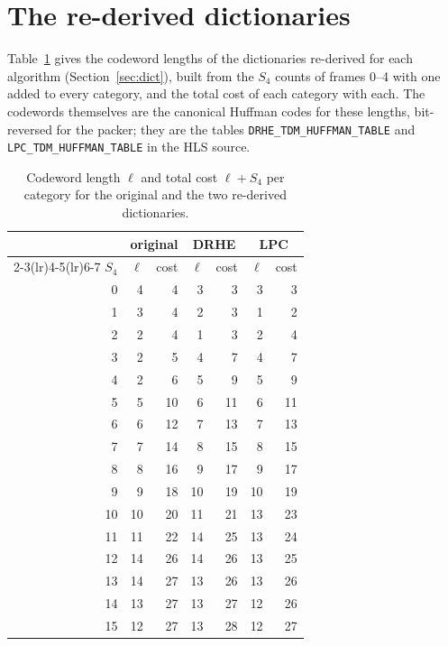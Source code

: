 \section*{The re-derived dictionaries}

Table~\ref{tab:rederived} gives the codeword lengths of the dictionaries
re-derived for each algorithm (Section~\ref{sec:dict}), built from the $S_4$
counts of frames 0--4 with one added to every category, and the total cost of
each category with each. The codewords themselves are the canonical Huffman
codes for these lengths, bit-reversed for the packer; they are the tables
\texttt{DRHE\_TDM\_HUFFMAN\_TABLE} and \texttt{LPC\_TDM\_HUFFMAN\_TABLE} in the
HLS source.

\begin{table}[h]
\centering
\caption[The re-derived dictionaries]{Codeword length $\ell$ and total cost
$\ell + S_4$ per category for the original and the two re-derived dictionaries.}
\label{tab:rederived}
\small
\begin{tabular}{@{}r rr rr rr@{}}
\toprule
& \multicolumn{2}{c}{original} & \multicolumn{2}{c}{DRHE} & \multicolumn{2}{c}{LPC}\\
\cmidrule(lr){2-3}\cmidrule(lr){4-5}\cmidrule(lr){6-7}
$S_4$ & $\ell$ & cost & $\ell$ & cost & $\ell$ & cost\\
\midrule
0 & 4 & 4 & 3 & 3 & 3 & 3\\
1 & 3 & 4 & 2 & 3 & 1 & 2\\
2 & 2 & 4 & 1 & 3 & 2 & 4\\
3 & 2 & 5 & 4 & 7 & 4 & 7\\
4 & 2 & 6 & 5 & 9 & 5 & 9\\
5 & 5 & 10 & 6 & 11 & 6 & 11\\
6 & 6 & 12 & 7 & 13 & 7 & 13\\
7 & 7 & 14 & 8 & 15 & 8 & 15\\
8 & 8 & 16 & 9 & 17 & 9 & 17\\
9 & 9 & 18 & 10 & 19 & 10 & 19\\
10 & 10 & 20 & 11 & 21 & 13 & 23\\
11 & 11 & 22 & 14 & 25 & 13 & 24\\
12 & 14 & 26 & 14 & 26 & 13 & 25\\
13 & 14 & 27 & 13 & 26 & 13 & 26\\
14 & 13 & 27 & 13 & 27 & 12 & 26\\
15 & 12 & 27 & 13 & 28 & 12 & 27\\
\bottomrule
\end{tabular}
\end{table}

